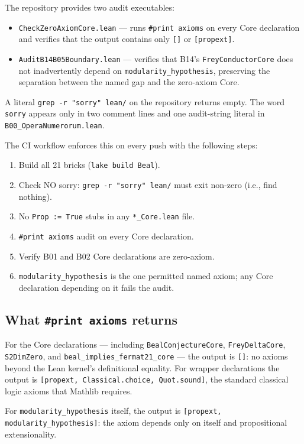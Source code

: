 \documentclass[12pt,reqno]{amsart}
\theoremstyle{plain}
\theoremstyle{definition}
\theoremstyle{remark}
\newcommand{\frcode}[1]{\texttt{#1}}
\begin{document}
The repository provides two audit executables:
\begin{itemize}
\item \frcode{CheckZeroAxiomCore.lean} — runs \texttt{\#print~axioms}
      on every Core declaration and verifies that the output contains
      only \texttt{[]} or \texttt{[propext]}.
\item \frcode{AuditB14B05Boundary.lean} — verifies that B14's
      \texttt{FreyConductorCore} does not inadvertently depend on
      \texttt{modularity\_hypothesis}, preserving the separation
      between the named gap and the zero-axiom Core.
\end{itemize}
A literal \texttt{grep -r "sorry" lean/} on the repository
returns empty. The word \texttt{sorry} appears only in two
comment lines and one audit-string literal in \texttt{B00\_OperaNumerorum.lean}.

The CI workflow enforces this on every push with the following steps:
\begin{enumerate}
\item Build all 21 bricks (\texttt{lake build Beal}).
\item Check NO sorry: \texttt{grep -r "sorry" lean/} must exit non-zero
      (i.e., find nothing).
\item No \texttt{Prop := True} stubs in any \texttt{*\_Core.lean} file.
\item \texttt{\#print axioms} audit on every Core declaration.
\item Verify B01 and B02 Core declarations are zero-axiom.
\item \texttt{modularity\_hypothesis} is the one permitted named axiom;
      any Core declaration depending on it fails the audit.
\end{enumerate}

\subsection{What \texttt{\#print axioms} returns}

For the Core declarations — including \texttt{BealConjectureCore},
\texttt{FreyDeltaCore}, \texttt{S2DimZero}, and
\texttt{beal\_implies\_fermat21\_core} — the output is \texttt{[]}:
no axioms beyond the Lean kernel's definitional equality.
For wrapper declarations the output is
\texttt{[propext, Classical.choice, Quot.sound]}, the standard
classical logic axioms that Mathlib requires.

For \texttt{modularity\_hypothesis} itself, the output is
\texttt{[propext, modularity\_hypothesis]}: the axiom depends only
on itself and propositional extensionality.
\end{document}
